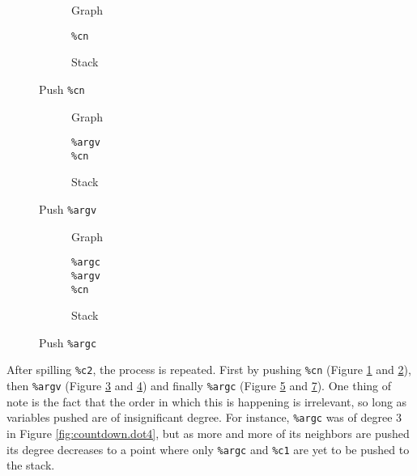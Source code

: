 \documentclass{article}
\begin{document}
\begin{figure}[H]
  \centering
  \begin{minipage}[c]{0.32\linewidth}
    \begin{subfigure}[b]{0.70\textwidth}
       
      \caption{Graph}\label{fig:countdown.dot5}
    \end{subfigure}
    \begin{subfigure}[b]{0.27\textwidth}
      \centering
        \texttt{\%cn}
        \vspace{0.5em}
      \caption{Stack}\label{fig:countdown.stack5}
    \end{subfigure}
    \caption{Push \texttt{\%cn}}
  \end{minipage}%
  \begin{minipage}[c]{0.32\linewidth}
    \begin{subfigure}[b]{0.70\textwidth}
       
      \caption{Graph}\label{fig:countdown.dot6}
    \end{subfigure}
    \begin{subfigure}[b]{0.27\textwidth}
      \centering
        \texttt{\%argv}\\
        \texttt{\%cn}
        \vspace{0.5em}
      \caption{Stack}\label{fig:countdown.stack6}
    \end{subfigure}
    \caption{Push \texttt{\%argv}}
  \end{minipage}%
  \begin{minipage}[c]{0.32\linewidth}
    \begin{subfigure}[b]{0.70\textwidth}
       
      \caption{Graph}\label{fig:countdown.dot7}
    \end{subfigure}
    \begin{subfigure}[b]{0.27\textwidth}
      \centering
      \texttt{\%argc}\\
      \texttt{\%argv}\\
      \texttt{\%cn}
      \vspace{0.5em}
      \caption{Stack}\label{fig:countdown.stack7}
    \end{subfigure}
    \caption{Push \texttt{\%argc}}
  \end{minipage}%
\end{figure}

\noindent After spilling \texttt{\%c2}, the process is repeated. First by pushing \texttt{\%cn} (Figure \ref{fig:countdown.dot5} and \ref{fig:countdown.stack5}), then \texttt{\%argv} (Figure \ref{fig:countdown.dot6} and \ref{fig:countdown.stack6}) and finally \texttt{\%argc} (Figure \ref{fig:countdown.dot7} and \ref{fig:countdown.stack7}). One thing of note is the fact that the order in which this is happening is irrelevant, so long as variables pushed are of insignificant degree. For instance, \texttt{\%argc} was of degree 3 in Figure \ref{fig:countdown.dot4}, but as more and more of its neighbors are pushed its degree decreases to a point where only \texttt{\%argc} and \texttt{\%c1} are yet to be pushed to the stack.
\end{document}
